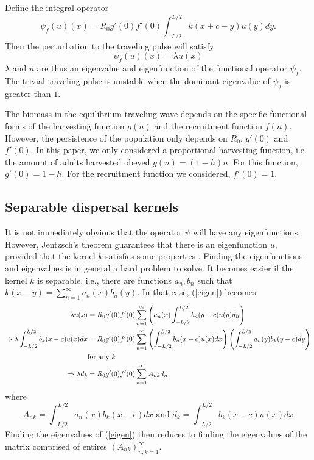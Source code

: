 \documentclass[12pt,english]{article}
\begin{document}
Define the integral operator
$$ \psi_f(u)(x)=R_0g'(0)f'(0)\int_{-L/2}^{L/2}k(x+c-y)u(y)dy. $$
Then the perturbation to the traveling pulse will satisfy 
\begin{equation} \psi_f(u)(x)=\lambda u(x) \label{eigen} \end{equation}
$\lambda$ and $u$ are thus an eigenvalue and eigenfunction of the functional operator $\psi_f$.  The trivial traveling pulse is unstable when the dominant eigenvalue of $\psi_f$ is greater than $1$.


The biomass in the equilibrium traveling wave depends on the specific functional forms of the harvesting function $g(n)$ and the recruitment function $f(n)$.  However, the persistence of the population only depends on $R_0$, $g'(0)$ and $f'(0)$. In this paper, we only considered a proportional harvesting function, i.e. the amount of adults harvested obeyed $g(n)=(1-h)n$.  For this function, $g'(0)=1-h$.  For the recruitment function we considered, $f'(0)=1$.

\subsection{Separable dispersal kernels \label{sep}}
It is not immediately obvious that the operator $\psi$ will have any eigenfunctions.  However, Jentzsch's theorem guarantees that there is an eigenfunction $u$, provided that the kernel $k$ satisfies some properties \citep{ZhouKot2011}.  Finding the eigenfunctions and eigenvalues is in general a hard problem to solve.  It becomes easier if the kernel $k$ is separable, i.e., there are functions $a_n,b_n$ such that $k(x-y)=\sum_{n=1}^\infty a_n(x)b_n(y)$.  In that case, (\ref{eigen}) becomes
\begin{align}
\lambda u(x)&=R_0g'(0)f'(0)\sum_{n=1}^\infty\left( a_n(x)\int_{-L/2}^{L/2}b_n(y-c)u(y)dy\right) \notag
\\ \Rightarrow \lambda\int_{-L/2}^{L/2}b_k(x-c)u(x)dx&=R_0g'(0)f'(0)\sum_{n=1}^{\infty}\left(\int_{-L/2}^{L/2}b_n(x-c)u(x)dx\right)\left(\int_{-L/2}^{L/2}a_n(y)b_k(y-c)dy\right) \notag
\\& \text{for any $k$} \notag
\\ \Rightarrow \lambda d_k&=R_0g'(0)f'(0)\sum_{n=1}^\infty A_{nk}d_n  \label{problem}
\end{align}
where
\begin{equation*}
A_{nk}=\int_{-L/2}^{L/2}a_n(x)b_k(x-c)dx \text{ and } d_k=\int_{-L/2}^{L/2}b_k(x-c)u(x)dx
\end{equation*}
Finding the eigenvalues of (\ref{eigen}) then reduces to finding the eigenvalues of the matrix comprised of entires $(A_{nk})_{n,k=1}^\infty$.
\end{document}
